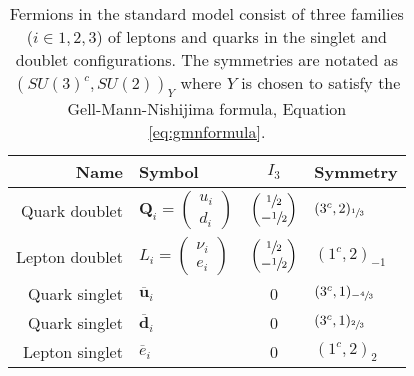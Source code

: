 \begin{table}[tb]\caption[Standard Model quarks and leptons]
{
Fermions in the standard model consist of three
 families ($i\in{1,2,3}$) of leptons and quarks
 in the singlet and doublet configurations.
The symmetries are notated as $(SU(3)^c,SU(2))_Y$ where
 $Y$ is chosen to satisfy the Gell-Mann-Nishijima
 formula, Equation \ref{eq:gmnformula}.
}
\label{tab:fermions}
\begin{center}
\begin{tabular}{r|l|c|l}
 Name & Symbol & $I_3$ & Symmetry \\
 \hline 
 \hline 
 Quark  doublet & $\mathbf{Q}_i=\begin{pmatrix}u_i \\ d_i \end{pmatrix}$    & 
  $\begin{pmatrix}\sfrac{1}{2} \\ -\sfrac{1}{2}\end{pmatrix}$          & $(3^c,2)_{\sfrac{1}{3}}$      \\
 Lepton doublet & $L_i=\begin{pmatrix}\nu_i \\ e_i \end{pmatrix}$      & 
  $\begin{pmatrix}\sfrac{1}{2} \\ -\sfrac{1}{2}\end{pmatrix}$          & $(1^c,2)_{-1}$                \\
 Quark  singlet & $\mathbf{\overline{u}}_i$                            & 0 & $(3^c,1)_{-\sfrac{4}{3}}$ \\
 Quark  singlet & $\mathbf{\overline{d}}_i$                            & 0 & $(3^c,1)_{\sfrac{2}{3}}$  \\
 Lepton singlet & $\overline{e}_i$                                     & 0 & $(1^c,2)_{2}$             
\end{tabular}
\end{center}
\end{table}

